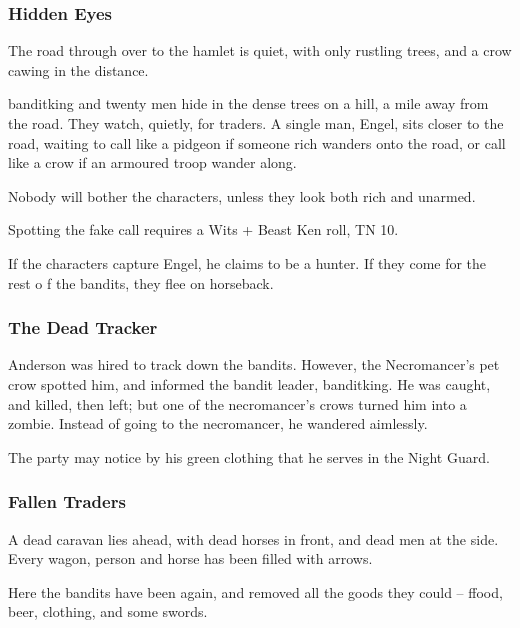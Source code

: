\subsubsection{Hidden Eyes}
\begin{boxtext}
The road through over to the hamlet is quiet, with only rustling trees, and a crow cawing in the distance.
\end{boxtext}

\gls{banditking} and twenty men hide in the dense trees on a hill, a mile away from the road.  They watch, quietly, for traders.  A single man, Engel, sits closer to the road, waiting to call like a pidgeon if someone rich wanders onto the road, or call like a crow if an armoured troop wander along.

Nobody will bother the characters, unless they look both rich and unarmed.

Spotting the fake call requires a Wits + Beast Ken roll, TN 10.

If the characters capture Engel, he claims to be a hunter.  If they come for the rest o f the bandits, they flee on horseback.


\humansoldier

\subsubsection{The Dead Tracker}
Anderson was hired to track down the bandits.  However, the Necromancer's pet crow spotted him, and informed the bandit leader, \gls{banditking}.  He was caught, and killed, then left; but one of the necromancer's crows turned him into a zombie.  Instead of going to the necromancer, he wandered aimlessly.

The party may notice by his green clothing that he serves in the Night Guard.

\zombie

\subsubsection{Fallen Traders}

\begin{boxtext}
	A dead caravan lies ahead, with dead horses in front, and dead men at the side.  Every wagon, person and horse has been filled with arrows.
\end{boxtext}

Here the bandits have been again, and removed all the goods they could -- ffood, beer, clothing, and some swords.

